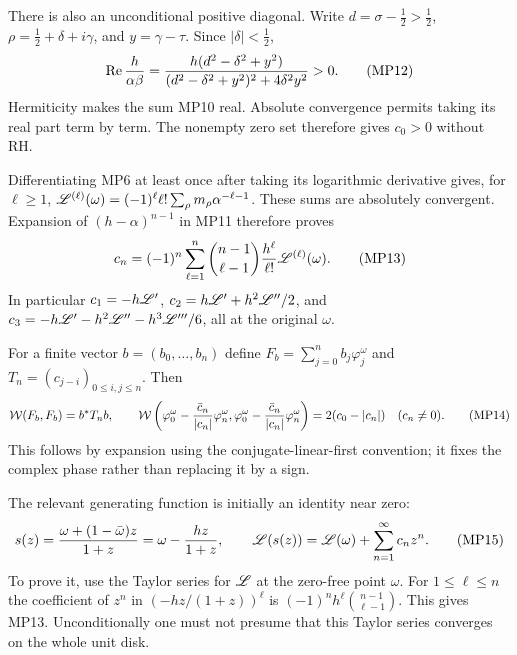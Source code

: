 There is also an unconditional positive diagonal. Write
$d=\sigma-\tfrac12>\tfrac12$, $\rho=\tfrac12+\delta+i\gamma$, and
$y=\gamma-\tau$. Since $|\delta|<\tfrac12$,
\begin{equation}
 \operatorname{Re}\frac h{\alpha\beta}
 =\frac{h(d^2-\delta^2+y^2)}
        {(d^2-\delta^2+y^2)^2+4\delta^2y^2}>0.
 \tag{MP12}
\end{equation}
Hermiticity makes the sum MP10 real. Absolute convergence permits taking
its real part term by term. The nonempty zero set therefore gives
$c_0>0$ without RH.

Differentiating MP6 at least once after taking its logarithmic derivative
gives, for $\ell\geq1$,
$\mathscr L^{(\ell)}(\omega)=(-1)^\ell\ell!\sum_\rho
m_\rho\alpha^{-\ell-1}$. These sums are absolutely convergent.
Expansion of $(h-\alpha)^{n-1}$ in MP11 therefore proves
\begin{equation}
 c_n=(-1)^n\sum_{\ell=1}^n\binom{n-1}{\ell-1}
               \frac{h^\ell}{\ell!}\mathscr L^{(\ell)}(\omega).
 \tag{MP13}
\end{equation}
In particular $c_1=-h\mathscr L'$, $c_2=h\mathscr L'+h^2\mathscr L''/2$, and
$c_3=-h\mathscr L'-h^2\mathscr L''-h^3\mathscr L'''/6$, all at the original $\omega$.

For a finite vector $b=(b_0,\ldots,b_n)$ define
$F_b=\sum_{j=0}^n b_j\varphi_j^\omega$ and
$T_n=(c_{j-i})_{0\leq i,j\leq n}$. Then
\begin{equation}
 \mathcal W(F_b,F_b)=b^*T_nb,\qquad
 \mathcal W\left(\varphi_0^\omega-
             \frac{\bar c_n}{|c_n|}\varphi_n^\omega,
          \varphi_0^\omega-
             \frac{\bar c_n}{|c_n|}\varphi_n^\omega\right)
       =2(c_0-|c_n|)\quad(c_n\ne0).
 \tag{MP14}
\end{equation}
This follows by expansion using the conjugate-linear-first convention;
it fixes the complex phase rather than replacing it by a sign.

The relevant generating function is initially an identity near zero:
\begin{equation}
 s(z)=\frac{\omega+(1-\bar\omega)z}{1+z}
     =\omega-\frac{hz}{1+z},\qquad
 \mathscr L(s(z))=\mathscr L(\omega)+\sum_{n=1}^\infty c_n z^n.
 \tag{MP15}
\end{equation}
To prove it, use the Taylor series for $\mathscr L$ at the zero-free point
$\omega$. For $1\leq\ell\leq n$ the coefficient of $z^n$ in
$(-hz/(1+z))^\ell$ is
$(-1)^n h^\ell\binom{n-1}{\ell-1}$. This gives MP13.
Unconditionally one must not presume that this Taylor series converges
on the whole unit disk.

